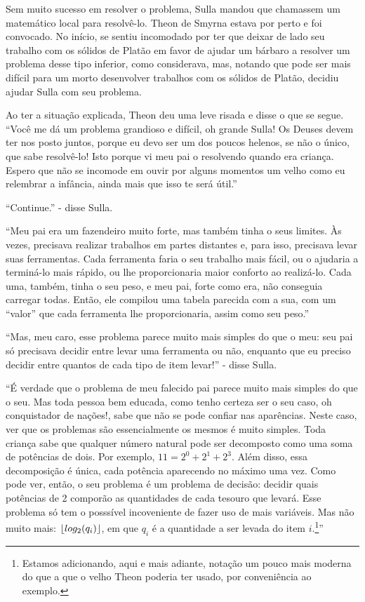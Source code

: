 \documentclass{article}
\begin{document}
Sem muito sucesso em resolver o problema, Sulla mandou que chamassem
um matemático local para resolvê-lo. Theon de Smyrna estava por perto
e foi convocado. No início, se sentiu incomodado por ter que deixar de
lado seu trabalho com os sólidos de Platão em favor de ajudar um
bárbaro a resolver um problema desse tipo inferior, como considerava,
mas, notando que pode ser mais difícil para um morto desenvolver
trabalhos com os sólidos de Platão, decidiu ajudar Sulla com seu
problema.

Ao ter a situação explicada, Theon deu uma leve risada e disse o que
se segue. ``Você me dá um problema grandioso e difícil, oh grande
Sulla! Os Deuses devem ter nos posto juntos, porque eu devo ser um dos
poucos helenos, se não o único, que sabe resolvê-lo! Isto porque vi
meu pai o resolvendo quando era criança. Espero que não se incomode em
ouvir por alguns momentos um velho como eu relembrar a infância, ainda
mais que isso te será útil.''

``Continue.'' - disse Sulla.

``Meu pai era um fazendeiro muito forte, mas também tinha o seus
limites. Às vezes, precisava realizar trabalhos em partes distantes e,
para isso, precisava levar suas ferramentas. Cada ferramenta faria o
seu trabalho mais fácil, ou o ajudaria a terminá-lo mais rápido, ou
lhe proporcionaria maior conforto ao realizá-lo. Cada uma, também,
tinha o seu peso, e meu pai, forte como era, não conseguia carregar
todas. Então, ele compilou uma tabela parecida com a sua, com um
``valor'' que cada ferramenta lhe proporcionaria, assim como seu
peso.''

``Mas, meu caro, esse problema parece muito mais simples do que o meu:
seu pai só precisava decidir entre levar uma ferramenta ou não,
enquanto que eu preciso decidir entre quantos de cada tipo de item
levar!'' - disse Sulla.

``É verdade que o problema de meu falecido pai parece muito mais
simples do que o seu. Mas toda pessoa bem educada, como tenho certeza
ser o seu caso, oh conquistador de nações!, sabe que não se pode
confiar nas aparências.  Neste caso, ver que os problemas são
essencialmente os mesmos é muito simples. Toda criança sabe que
qualquer número natural pode ser decomposto como uma soma de potências
de dois. Por exemplo, $11 = 2^0 + 2^1 + 2^3$. Além disso, essa
decomposição é única, cada potência aparecendo no máximo uma vez.
Como pode ver, então, o seu problema é um problema de decisão: decidir
quais potências de 2 comporão as quantidades de cada tesouro que
levará. Esse problema só tem o posssível incoveniente de fazer uso de
mais variáveis. Mas não muito mais: $\lfloor log_2(q_i)\rfloor$, em que $q_i$
é a quantidade a ser levada do item $i$.\footnote{Estamos adicionando,
  aqui e mais adiante, notação um pouco mais moderna do que a que o
  velho Theon poderia ter usado, por conveniência ao exemplo.}''
\end{document}
